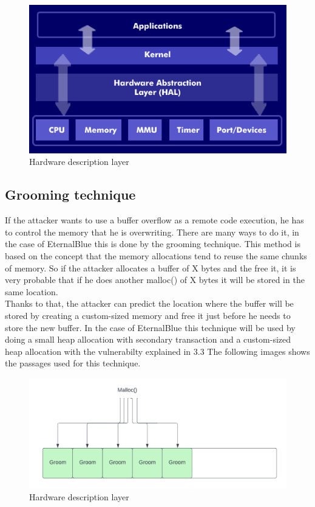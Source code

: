 \begin{figure}[ht!]
    \centering
      \includegraphics[scale=0.5]{images/hal.png}
      \caption{Hardware description layer}
\end{figure}

\clearpage

\subsection{Grooming technique}
If the attacker wants to use a buffer overflow as a remote code execution, he has to control the memory that he is overwriting. There are many ways to do it, in 
the case of EternalBlue this is done by the grooming technique. This method is based on the concept that the memory allocations tend to reuse the same chunks of memory. So if the 
attacker allocates a buffer of X bytes and the free it, it is very probable that if he does another malloc() of X bytes it will be stored in the same location.\\
Thanks to that, the attacker can predict the location where the buffer will be stored by creating a custom-sized memory and free it just before he needs to store the new buffer. In the case of 
EternalBlue this technique will be used by doing a small heap allocation with secondary transaction and a custom-sized heap allocation with the vulnerabilty explained in 3.3
The following images shows the passages used for this technique.

\begin{figure}[ht!]
    \centering
      \includegraphics[scale=0.5]{images/grooming_malloc.png}
      \caption{Hardware description layer}
\end{figure}

